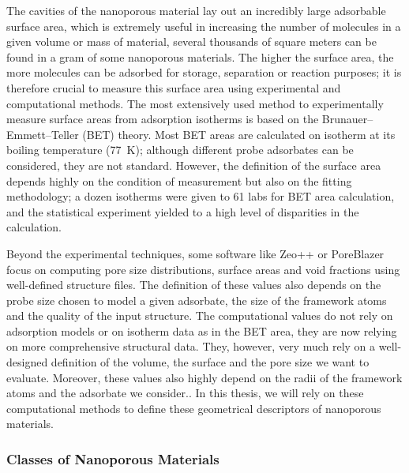 \documentclass[main.tex]{subfiles}
\begin{document}
The cavities of the nanoporous material lay out an incredibly large adsorbable surface area, which is extremely useful in increasing the number of molecules in a given volume or mass of material, several thousands of square meters can be found in a gram of some nanoporous materials.\cite{Farha_2012} The higher the surface area, the more molecules can be adsorbed for storage, separation or reaction purposes; it is therefore crucial to measure this surface area using experimental and computational methods. The most extensively used method to experimentally measure surface areas from adsorption isotherms is based on the Brunauer–Emmett–Teller (BET) theory.\cite{Detsi_2011} Most BET areas are calculated on  isotherm at its boiling temperature (\SI{77}{\kelvin}); although different probe adsorbates can be considered, they are not standard.\cite{Tian_2017} However, the definition of the surface area depends highly on the condition of measurement but also on the fitting methodology; a dozen isotherms were given to 61 labs for BET area calculation, and the statistical experiment yielded to a high level of disparities in the calculation.\cite{Osterrieth_2022} 

Beyond the experimental techniques, some software like Zeo++ or PoreBlazer focus on computing pore size distributions, surface areas and void fractions using well-defined structure files.\cite{Zeo++,PoreBlazer} The definition of these values also depends on the probe size chosen to model a given adsorbate, the size of the framework atoms and the quality of the input structure. The computational values do not rely on adsorption models or on isotherm data as in the BET area, they are now relying on more comprehensive structural data. They, however, very much rely on a well-designed definition of the volume, the surface and the pore size we want to evaluate. Moreover, these values also highly depend on the radii of the framework atoms and the adsorbate we consider.\cite{Hung_2021}. In this thesis, we will rely on these computational methods to define these geometrical descriptors of nanoporous materials.

\subsubsection{Classes of Nanoporous Materials}
\end{document}
